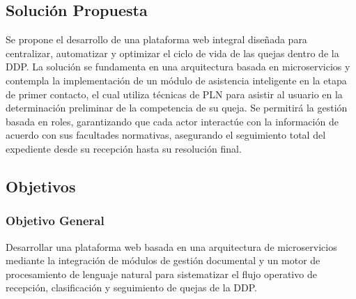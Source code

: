 \documentclass[12pt, letterpaper]{article}
\begin{document}
\subsection{Solución Propuesta}
Se propone el desarrollo de una plataforma web integral diseñada para centralizar, automatizar y optimizar el ciclo de vida de las quejas dentro de la DDP. La solución se fundamenta en una arquitectura basada en microservicios y contempla la implementación de un módulo de asistencia inteligente en la etapa de primer contacto, el cual utiliza técnicas de PLN para asistir al usuario en la determinación preliminar de la competencia de su queja. Se permitirá la gestión basada en roles, garantizando que cada actor interactúe con la información de acuerdo con sus facultades normativas, asegurando el seguimiento total del expediente desde su recepción hasta su resolución final.

\subsection{Objetivos}
\subsubsection{Objetivo General}
Desarrollar una plataforma web basada en una arquitectura de microservicios mediante la integración de módulos de gestión documental y un motor de procesamiento de lenguaje natural para sistematizar el flujo operativo de recepción, clasificación y seguimiento de quejas de la DDP.
\end{document}
